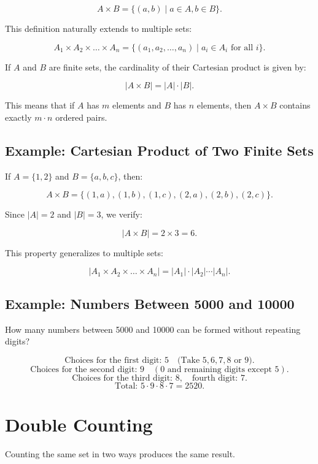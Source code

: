 \documentclass[11pt]{article}
\newcommand{\card}[1]{\lvert #1 \rvert}
\begin{document}
\[
A \times B = \{ (a, b) \mid a \in A, b \in B \}.
\]

This definition naturally extends to multiple sets:

\[
A_1 \times A_2 \times \dots \times A_n = \{ (a_1, a_2, \dots, a_n) \mid a_i \in A_i \text{ for all } i \}.
\]

If $ A $ and $ B $ are finite sets, the cardinality of their Cartesian product is given by:

\[
\card{A \times B} = \card{A} \cdot \card{B}.
\]

This means that if $ A $ has $ m $ elements and $ B $ has $ n $ elements, then $ A \times B $ contains exactly $ m \cdot n $ ordered pairs.

\subsection*{Example: Cartesian Product of Two Finite Sets}
If $ A = \{1, 2\} $ and $ B = \{a, b, c\} $, then:

\[
A \times B = \{ (1, a), (1, b), (1, c), (2, a), (2, b), (2, c) \}.
\]

Since $ \card{A} = 2 $ and $ \card{B} = 3 $, we verify:

\[
\card{A \times B} = 2 \times 3 = 6.
\]

This property generalizes to multiple sets:

\[
\card{A_1 \times A_2 \times \dots \times A_n} = \card{A_1} \cdot \card{A_2} \cdots \card{A_n}.
\]

\subsection*{Example: Numbers Between 5000 and 10000}
How many numbers between 5000 and 10000 can be formed without repeating digits?

\[
\text{Choices for the first digit: } 5 \quad \text{(Take } 5, 6, 7, 8 \text{ or 9).}
\]
\[
\text{Choices for the second digit: } 9 \quad (0 \text{ and remaining digits except }5).
\]
\[
\text{Choices for the third digit: } 8, \quad \text{fourth digit: } 7.
\]
\[
\text{Total: } 5 \cdot 9 \cdot 8 \cdot 7 = 2520.
\]

\section{Double Counting}

Counting the same set in two ways produces the same result.
\end{document}
